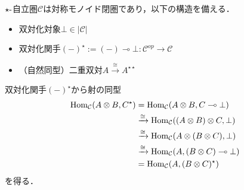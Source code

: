 \documentclass[type_judgement.tex]{subfiles}
\begin{document}

\begin{defn}
\label{def:star-auto}
$\star\mathchar`-$自立圏$\mathcal{C}$は対称モノイド閉圏であり，以下の構造を備える．
\begin{itemize}
    \item 双対化対象$\bot\in|\mathcal{C}|$
    \item 双対化関手$(-)^\star:=(-)\multimap \bot:\mathcal{C}^{op} \rightarrow \mathcal{C}$
    \item （自然同型）二重双対$A \xrightarrow{\cong} A^{\star\star}$
\end{itemize}
\end{defn}

双対化関手$(-)^\star$から射の同型
\begin{align*}
    \mathop{\mathrm{Hom}}\nolimits_\mathcal{C}(A \otimes B, C^\star) &= \mathop{\mathrm{Hom}}\nolimits_\mathcal{C}(A \otimes B, C \multimap \bot) \\
    &\xrightarrow{\cong} \mathop{\mathrm{Hom}}\nolimits_\mathcal{C}((A \otimes B) \otimes C, \bot) \\
    &\xrightarrow{\cong} \mathop{\mathrm{Hom}}\nolimits_\mathcal{C}(A \otimes (B \otimes C),  \bot) \\
    &\xrightarrow{\cong} \mathop{\mathrm{Hom}}\nolimits_\mathcal{C}(A, (B \otimes C) \multimap \bot) \\
    &= \mathop{\mathrm{Hom}}\nolimits_\mathcal{C}(A, (B \otimes C)^\star)
\end{align*}
を得る．
\end{document}
